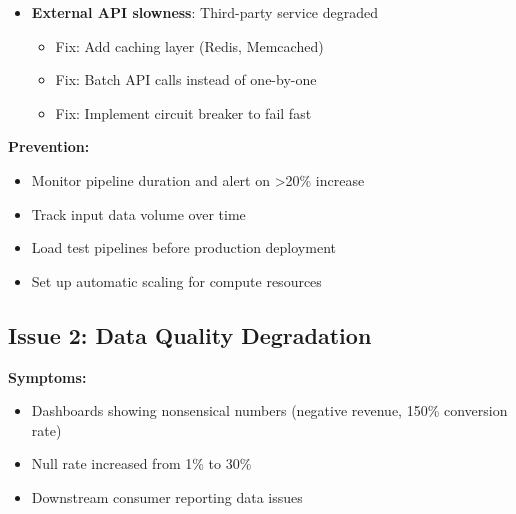 \begin{enumerate}
\begin{itemize}
            \item \textbf{External API slowness}: Third-party service degraded
                \begin{itemize}
                    \item Fix: Add caching layer (Redis, Memcached)
                    \item Fix: Batch API calls instead of one-by-one
                    \item Fix: Implement circuit breaker to fail fast
                \end{itemize}
        \end{itemize}
\end{enumerate}

\textbf{Prevention:}
\begin{itemize}
    \item Monitor pipeline duration and alert on >20\% increase
    \item Track input data volume over time
    \item Load test pipelines before production deployment
    \item Set up automatic scaling for compute resources
\end{itemize}

\subsection{Issue 2: Data Quality Degradation}

\textbf{Symptoms:}
\begin{itemize}
    \item Dashboards showing nonsensical numbers (negative revenue, 150\% conversion rate)
    \item Null rate increased from 1\% to 30\%
    \item Downstream consumer reporting data issues
\end{itemize}

